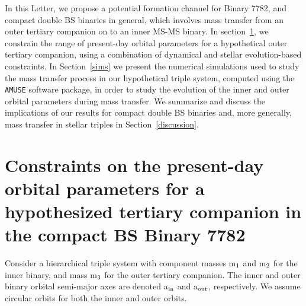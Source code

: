 \documentclass[useAMS,usenatbib]{mnras}
\begin{document}
In this Letter, we propose a potential formation channel for Binary 7782, and compact double BS binaries in general, which involves mass transfer from an outer tertiary companion on to an inner MS-MS binary.  In section~\ref{dyn}, we constrain the range of present-day orbital parameters for a hypothetical outer tertiary companion, using a combination of dynamical and stellar evolution-based constraints.  In Section~\ref{sims} we present the numerical simulations used to study the mass transfer process in our hypothetical triple system, computed using the \texttt{AMUSE} software package, in order to study the evolution of the inner and outer orbital parameters during mass transfer.  We summarize and discuss the implications of our results for compact double BS binaries and, more generally, mass transfer in stellar triples in Section~\ref{discussion}.  

\section{Constraints on the present-day orbital parameters for a hypothesized tertiary companion in the compact BS Binary 7782} \label{dyn}

Consider a hierarchical triple system with component masses m$_{\rm 1}$ and m$_{\rm 2}$ for the inner binary, and mass m$_{\rm 3}$ for the outer tertiary companion.  The inner and outer binary orbital semi-major axes are denoted a$_{\rm in}$ and a$_{\rm out}$, respectively.  We assume circular orbits for both the inner and outer orbits.  
\end{document}
